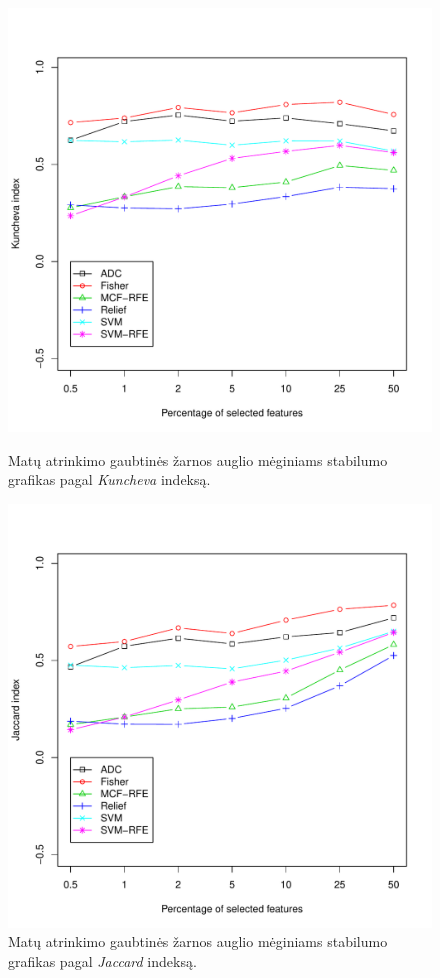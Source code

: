 \begin{figure}[!htb]
\capstart
\begin{minipage}[b]{0.5\linewidth}
\centering
\includegraphics[width=\textwidth]{../bachelor/images/nncolon_robustness_kuncheva.pdf}
\caption{Matų atrinkimo gaubtinės žarnos auglio mėginiams stabilumo grafikas pagal \textit{Kuncheva} indeksą.}
\label{fig:robk_colon}
\end{minipage}
\hspace{0.1cm}
\begin{minipage}[b]{0.5\linewidth}
\centering
\includegraphics[width=\textwidth]{../bachelor/images/nncolon_robustness_jaccard.pdf}
\caption{Matų atrinkimo gaubtinės žarnos auglio mėginiams stabilumo grafikas pagal \textit{Jaccard} indeksą.}
\label{fig:robj_colon}
\end{minipage}
\end{figure}


